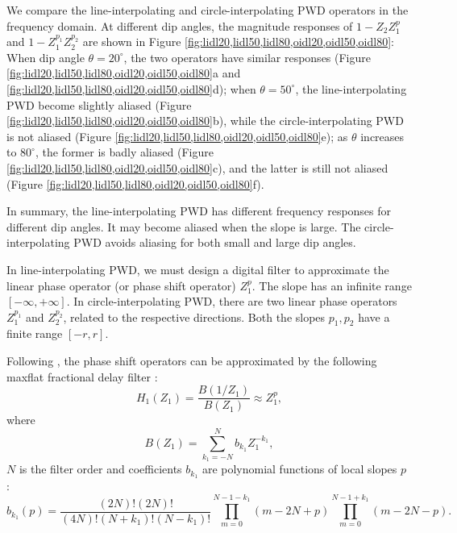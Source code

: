 We compare the line-interpolating and circle-interpolating PWD operators
in the frequency domain.
At different dip angles,
the magnitude responses of $1-Z_2Z_1^p$ and $1-Z_1^{p_1}Z_2^{p_2}$
are shown in Figure \ref{fig:lidl20,lidl50,lidl80,oidl20,oidl50,oidl80}:
When dip angle $\theta=20^\circ$, the two operators have similar responses
(Figure \ref{fig:lidl20,lidl50,lidl80,oidl20,oidl50,oidl80}a and
\ref{fig:lidl20,lidl50,lidl80,oidl20,oidl50,oidl80}d);
when 
$\theta=50^\circ$, the line-interpolating PWD become slightly aliased
(Figure \ref{fig:lidl20,lidl50,lidl80,oidl20,oidl50,oidl80}b),
while the circle-interpolating PWD 
is not aliased
(Figure \ref{fig:lidl20,lidl50,lidl80,oidl20,oidl50,oidl80}e);
as $\theta$ increases to $80^\circ$, the former is badly aliased
(Figure \ref{fig:lidl20,lidl50,lidl80,oidl20,oidl50,oidl80}c),
and the latter is still not aliased
(Figure \ref{fig:lidl20,lidl50,lidl80,oidl20,oidl50,oidl80}f).

In summary, the line-interpolating PWD 
has different frequency responses for different dip angles.
It may become aliased when the slope is large.
The circle-interpolating PWD avoids aliasing
for both small and large dip angles.





In line-interpolating PWD,
we must design a digital filter to approximate 
the linear phase operator (or phase shift operator) $Z_1^p$.
The slope has an infinite range $[-\infty,+\infty]$.
In circle-interpolating PWD,
there are two linear phase operators $Z_1^{p_1}$ and $Z_2^{p_2}$,
related to the respective directions.
Both the slopes $p_1, p_2$ have a finite range $[-r,r]$.

Following \cite{fomel:1946},
the phase shift operators can be approximated by
the following maxflat fractional delay filter \cite[]{thiran1971recursive}:
\begin{equation}\label{eq:fd1d}
H_1(Z_1)=\frac{B(1/Z_1)}{B(Z_1)}\approx Z_1^p,
\end{equation}
where
\begin{equation}
B(Z_1)=\sum_{{k_1}=-N}^N b_{{k_1}}Z_1^{-{k_1}},
\end{equation}
$N$ is the filter order
and coefficients $b_{{k_1}}$ are polynomial functions of local slopes $p$
\cite[]{chen:2012a}:
\begin{equation}\label{eq:coef}
b_{k_1}(p)=
\frac{(2N)!(2N)!}{(4N)!(N+k_1)!(N-k_1)!}
\prod_{m=0}^{N-1-k_1}(m-2N+p)
\prod_{m=0}^{N-1+k_1}(m-2N-p).
\end{equation}


